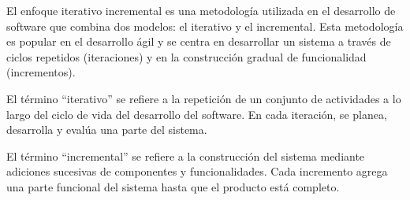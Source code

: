 El enfoque iterativo incremental es una metodología utilizada en el desarrollo de software que combina dos modelos:
el iterativo y el incremental.
Esta metodología es popular en el desarrollo ágil y se centra en desarrollar un sistema a través de ciclos repetidos
(iteraciones) y en la construcción gradual de funcionalidad (incrementos).

El término ``iterativo'' se refiere a la repetición de un conjunto de actividades a lo largo del ciclo de vida del
desarrollo del software.
En cada iteración, se planea, desarrolla y evalúa una parte del sistema.

El término ``incremental'' se refiere a la construcción del sistema mediante adiciones sucesivas de componentes y
funcionalidades.
Cada incremento agrega una parte funcional del sistema hasta que el producto está completo.
